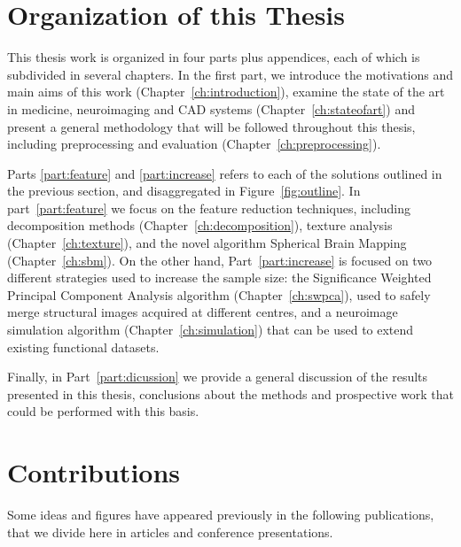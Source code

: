 \section{Organization of this Thesis}
This thesis work is organized in four parts plus appendices, each of which is subdivided in several chapters. In the first part, we introduce the motivations and main aims of this work (Chapter~\ref{ch:introduction}), examine the state of the art in medicine, neuroimaging and \ac{CAD} systems (Chapter~\ref{ch:stateofart}) and present a general methodology that will be followed throughout this thesis, including preprocessing and evaluation (Chapter~\ref{ch:preprocessing}). 

Parts \ref{part:feature} and \ref{part:increase} refers to each of the solutions outlined in the previous section, and disaggregated in Figure~\ref{fig:outline}. In part~\ref{part:feature} we focus on the feature reduction techniques, including decomposition methods (Chapter~\ref{ch:decomposition}), texture analysis (Chapter~\ref{ch:texture}), and the novel algorithm Spherical Brain Mapping (Chapter~\ref{ch:sbm}). On the other hand, Part~\ref{part:increase} is focused on two different strategies used to increase the sample size: the Significance Weighted Principal Component Analysis algorithm (Chapter~\ref{ch:swpca}), used to safely merge structural images acquired at different centres, and a neuroimage simulation algorithm (Chapter~\ref{ch:simulation}) that can be used to extend existing functional datasets. 

Finally, in Part~\ref{part:dicussion} we provide a general discussion of the results presented in this thesis, conclusions about the methods and prospective work that could be performed with this basis. 

\section{Contributions}
Some ideas and figures have appeared previously in the following publications, that we divide here in articles and conference presentations. 


